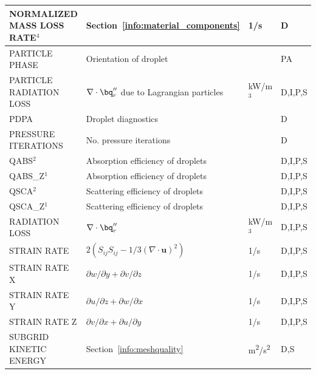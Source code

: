 \documentclass[11pt]{book}
\begin{document}
\begin{longtable}{@{\extracolsep{\fill}}|l|l|l|l|}
{\ct NORMALIZED MASS LOSS RATE}$^4$             & Section~\ref{info:material_components}            & 1/s            & D            \\ \hline
{\ct PARTICLE PHASE}                            & Orientation of droplet                            &                & PA           \\ \hline
{\ct PARTICLE RADIATION LOSS}                   & $\nabla \cdot \bq_r''$ due to Lagrangian particles& kW/m$^3$       & D,I,P,S      \\ \hline
{\ct PDPA}                                      & Droplet diagnostics                               &                & D            \\ \hline
{\ct PRESSURE ITERATIONS}                       & No. pressure iterations                           &                & D            \\ \hline
{\ct QABS}$^2$                                  & Absorption efficiency of droplets                 &                & D,I,P,S      \\ \hline
{\ct QABS\_Z}$^1$                               & Absorption efficiency of droplets                 &                & D,I,P,S      \\ \hline
{\ct QSCA}$^2$                                  & Scattering efficiency of droplets                 &                & D,I,P,S      \\ \hline
{\ct QSCA\_Z}$^1$                               & Scattering efficiency of droplets                 &                & D,I,P,S      \\ \hline
{\ct RADIATION LOSS}                            & $\nabla \cdot \bq_r''$                            & kW/m$^3$       & D,I,P,S      \\ \hline
{\ct STRAIN RATE}                               & $2(S_{ij}S_{ij}-1/3(\nabla\cdot\mathbf{u})^2)$    & 1/s            & D,I,P,S      \\ \hline
{\ct STRAIN RATE X}                             & $\partial w/\partial y + \partial v/\partial z$   & 1/s            & D,I,P,S      \\ \hline
{\ct STRAIN RATE Y}                             & $\partial u/\partial z + \partial w/\partial x$   & 1/s            & D,I,P,S      \\ \hline
{\ct STRAIN RATE Z}                             & $\partial v/\partial x + \partial u/\partial y$   & 1/s            & D,I,P,S      \\ \hline
{\ct SUBGRID KINETIC ENERGY}                    & Section~\ref{info:meshquality}                    & \si{m^2/s^2}   & D,S          \\ \hline

\end{longtable}
\end{document}
